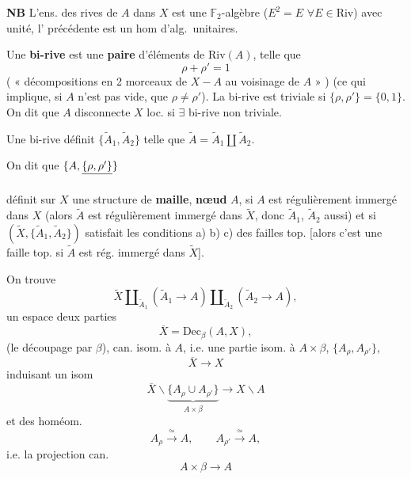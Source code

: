 \documentclass[11pt,a4paper]{article}
\begin{document}
\textbf{NB} L'ens. des  rives de $A$ dans $X$  est une $\mathbb{F}_2$-algèbre  ($E^2 = E$ $\forall E \in \mathrm{Riv}$) avec unité, l' précédente est un hom d'alg.\ unitaires.

Une \textbf{bi-rive}  est une \textbf{paire}  d'éléments de $\mathrm{Riv}(A)$, telle que
\[
  \rho + \rho' = 1
\]
( « décompositions en 2 morceaux de $X - A$ au voisinage de $A$ » \ill{})
 (ce qui implique, si $A$ n'est pas vide, que $\rho \neq \rho'$). La bi-rive est triviale si $\{\rho, \rho'\} = \{0, 1\}$. On dit que $A$ disconnecte $X$ loc. si $\exists$ bi-rive non triviale.

 Une bi-rive définit $\{\widetilde{A}_1, \widetilde{A}_2\}$ telle que $\widetilde{A} = \widetilde{A}_1 \amalg \widetilde{A}_2$.

On dit que  $\{A, \struck{\{\rho,\rho'\}}\}$

définit sur $X$ une structure de  \textbf{maille},   \textbf{nœud} $A$, si   $A$ est régulièrement immergé dans $X$ (alors \struck{\ill{}} $\widetilde{A}$ est régulièrement immergé dans $\widetilde{X}$, donc $\widetilde{A}_1$, $\widetilde{A}_2$ aussi) et si $(\widetilde{X}, \{\widetilde{A}_1, \widetilde{A}_2\})$ satisfait les conditions a) b) c) des failles top. [alors c'est une faille
top. si $\widetilde{A}$ est rég. immergé dans $\widetilde{X}$].

 On trouve
\[
  \widetilde{X} \amalg_{\widetilde{A}_1} (\widetilde{A}_1 \to A) \amalg_{\widetilde{A}_2} (\widetilde{A}_2 \to A),
\]
un espace \ill{}  deux parties
\[
  \overline{X} = \mathrm{Dec}_{\beta}(A, X),
\]
(le découpage par $\beta$), can. isom. à $A$, \struck{\ill{}} i.e. une partie isom. à $A \times \beta$, $\{A_\rho, A_{\rho'}\}$,
\[
  \overline{X} \longrightarrow X
\]
induisant un isom
\[
  \overline{X} \smallsetminus \underbrace{\{A_\rho \cup A_{\rho'}\}}_{A \times \beta} \longrightarrow X \smallsetminus A
\]
et des homéom.
\[
  A_\rho \xrightarrow{\ \simeq\ } A, \qquad A_{\rho'} \xrightarrow{\ \simeq\ } A,
\]
i.e. la projection can.
\[
  A \times \beta \longrightarrow A
\]
\end{document}
